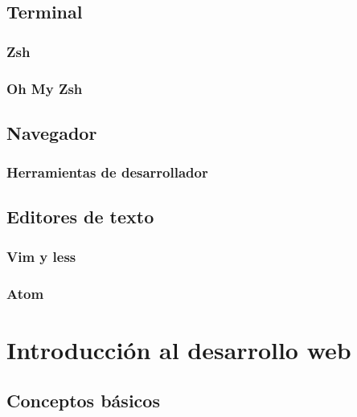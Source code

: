\documentclass[a4paper,12pt,spanish]{sphinxmanual}
\begin{document}
\section{Terminal}
\label{\detokenize{introduccion:terminal}}

\subsection{Zsh}
\label{\detokenize{introduccion:zsh}}

\subsection{Oh My Zsh}
\label{\detokenize{introduccion:oh-my-zsh}}

\section{Navegador}
\label{\detokenize{introduccion:navegador}}

\subsection{Herramientas de desarrollador}
\label{\detokenize{introduccion:herramientas-de-desarrollador}}

\section{Editores de texto}
\label{\detokenize{introduccion:editores-de-texto}}

\subsection{Vim y less}
\label{\detokenize{introduccion:vim-y-less}}

\subsection{Atom}
\label{\detokenize{introduccion:atom}}

\chapter{Introducción al desarrollo web}
\label{\detokenize{introduccion:introduccion-al-desarrollo-web}}

\section{Conceptos básicos}
\label{\detokenize{introduccion:conceptos-basicos}}
\end{document}
